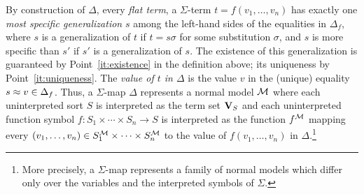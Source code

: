 \documentclass{svjour3}                     %
\begin{document}
\noindent
By construction of $\Delta$, every \emph{flat term},
a $\Sigma$-term $t = f(v_1,\ldots,v_n)$
has exactly one \emph{most specific generalization} $s$ among the left-hand sides
of the equalities in $\Delta_f$,
where $s$ is a generalization of $t$ if $t = s\sigma$ for some substitution $\sigma$,
and $s$ is more specific than $s'$ if $s'$ is a generalization of $s$.
The existence of this generalization is guaranteed by Point~\ref{it:existence} 
in the definition above;
its uniqueness by Point~\ref{it:uniqueness}.
The \emph{value of $t$ in $\Delta$} is 
the value $v$ in the (unique) equality $s \approx v \in \Delta_f$.
Thus, a $\Sigma$-map $\Delta$ represents a normal model $\mathcal{M}$
where each uninterpreted sort $S$ is interpreted as the term set $\mathbf{V}_S$ and 
each uninterpreted function symbol $f : S_1 \times \cdots \times S_n \rightarrow S$ 
is interpreted as the function $f^{\mathcal{M}}$ mapping 
every $(v_1,\ldots,v_n) \in S_1^{\mathcal{M}} \times \cdots \times S_n^{\mathcal{M}}$
to the value of $f(v_1,\ldots,v_n)$ in $\Delta$.\footnote{%
More precisely,
a $\Sigma$-map represents a family of normal models which differ only 
over the variables and the interpreted symbols of $\Sigma$. 
}
\end{document}
